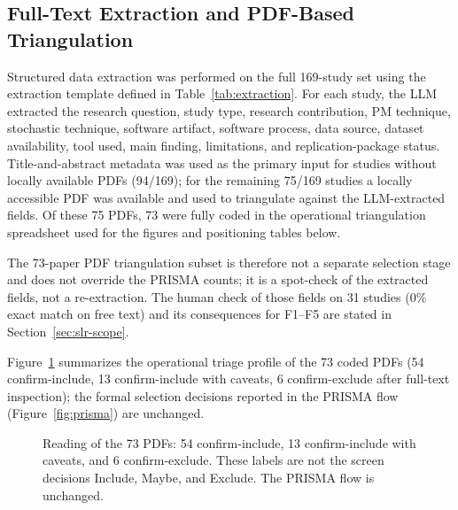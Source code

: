 \subsection{Full-Text Extraction and PDF-Based Triangulation}
\label{sec:slr-pdf-enrichment}

Structured data extraction was performed on the full 169-study set using the
extraction template defined in Table~\ref{tab:extraction}. For each study,
the LLM extracted the research question, study type, research contribution,
PM technique, stochastic technique, software artifact, software process, data
source, dataset availability, tool used, main finding, limitations, and
replication-package status. Title-and-abstract metadata was used as the
primary input for studies without locally available PDFs (94/169); for the
remaining 75/169 studies a locally accessible PDF was available and used to
triangulate against the LLM-extracted fields. Of these 75 PDFs, 73 were
fully coded in the operational triangulation spreadsheet used for the
figures and positioning tables below.

The 73-paper PDF triangulation subset is therefore not a separate selection
stage and does not override the PRISMA counts; it is a spot-check of the
extracted fields, not a re-extraction. The human check of those fields on
31 studies (0\% exact match on free text) and its consequences for F1--F5
are stated in Section~\ref{sec:slr-scope}.

Figure~\ref{fig:pdf-decision-dist} summarizes the operational triage profile
of the 73 coded PDFs (54 confirm-include, 13 confirm-include with
caveats, 6 confirm-exclude after full-text inspection); the formal selection
decisions reported in the PRISMA flow (Figure~\ref{fig:prisma}) are
unchanged.

\begin{figure}[tbp]
\centering
{}
\caption{Reading of the 73 PDFs: 54 confirm-include, 13 confirm-include with
caveats, and 6 confirm-exclude. These labels are not the screen decisions
Include, Maybe, and Exclude. The PRISMA flow is unchanged.}
\label{fig:pdf-decision-dist}
\end{figure}

